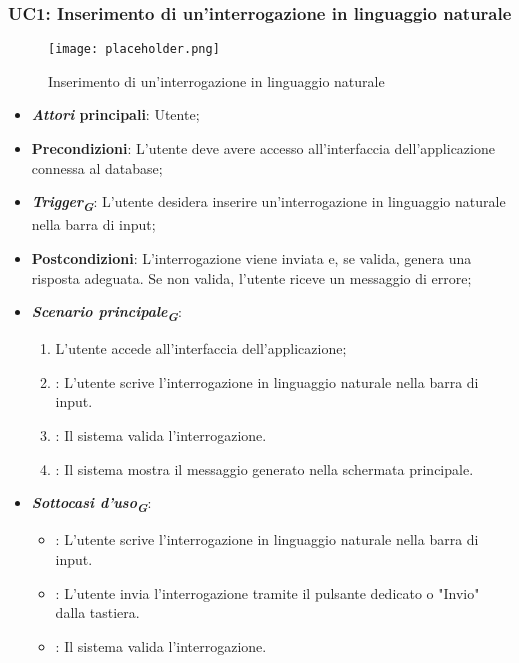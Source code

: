 \hypertarget{UC1}{}
\subsubsection{UC1: Inserimento di un'interrogazione in linguaggio naturale}

\begin{figure}[h]
    \centering
    \texttt{[image: placeholder.png]}
    \caption{Inserimento di un'interrogazione in linguaggio naturale}
\end{figure}

\begin{itemize}
    \item \textbf{\emph{Attori} principali}: Utente;
    \item \textbf{Precondizioni}: L'utente deve avere accesso all'interfaccia dell'applicazione connessa al database;
    \item \textbf{\emph{Trigger}\textsubscript{\textbf{\textit{G}}}}: L'utente desidera inserire un'interrogazione in linguaggio naturale nella barra di input;
    \item \textbf{Postcondizioni}: L'interrogazione viene inviata e, se valida, genera una risposta adeguata. Se non valida, l'utente riceve un messaggio di errore;
    \item \textbf{\emph{Scenario principale}\textsubscript{\textbf{\textit{G}}}}:
    \begin{enumerate}
        \item L'utente accede all'interfaccia dell'applicazione;
        \item {}: L'utente scrive l'interrogazione in linguaggio naturale nella barra di input.
        \item {}: Il sistema valida l'interrogazione.
        \item {}: Il sistema mostra il messaggio generato nella schermata principale.
    \end{enumerate}
    \item \textbf{\emph{Sottocasi d'uso}\textsubscript{\textbf{\textit{G}}}}:
    \begin{itemize}
        \item {}: L'utente scrive l'interrogazione in linguaggio naturale nella barra di input.
        \item {}: L'utente invia l'interrogazione tramite il pulsante dedicato o "Invio" dalla tastiera.
        \item {}: Il sistema valida l'interrogazione.

\end{itemize}
\end{itemize}
